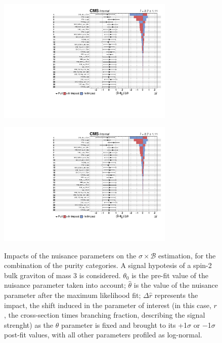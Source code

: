 \begin{figure}[!h]
   \caption{Impacts of the nuisance parameters on the $\sigma \times \mathcal{B}$ estimation, for the combination of the purity categories. A signal hypotesis of a spin-2 bulk graviton of mass 3 \TeV is considered. $\theta_0$ is the pre-fit value of the nuisance parameter taken into account; $\hat{\theta}$ is the value of the nuisance parameter after the maximum likelihood fit; $\Delta \hat{r}$ represents the impact,  the shift induced in the parameter of interest (in this case, $r$, the cross-section times branching fraction, describing the signal strenght) as the $\theta$ parameter is fixed and brought to its +1$\sigma$ or −1$\sigma$ post-fit values, with all other parameters profiled as log-normal.}
 \begin{center}
   \includegraphics[width=0.75\textwidth]{impacts_VZ_data_1fb/impacts_XZZInv_XVZnn_M2500.pdf}

   \includegraphics[page=2, width=0.75\textwidth]{impacts_VZ_data_1fb/impacts_XZZInv_XVZnn_M2500.pdf}
   \label{fig:impacts}
 \end{center}
\end{figure}


